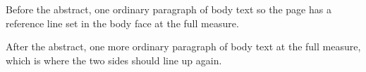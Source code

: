 \documentclass{article}
\begin{document}
Before the abstract, one ordinary paragraph of body text so the page has a
reference line set in the body face at the full measure.

\begin{abstract}
This abstract is set by the article class in \verb!\small! (9\,pt at a 10\,pt
base) and indented on both sides by the class's abstract margins, so both the
face size and the measure differ from the body text around it.
\end{abstract}

After the abstract, one more ordinary paragraph of body text at the full
measure, which is where the two sides should line up again.
\end{document}
